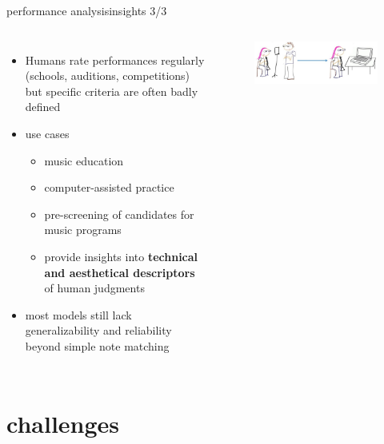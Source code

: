         \begin{frame}{performance analysis}{insights 3/3}
            \vspace{-5mm}
            \begin{columns}
            \begin{itemize}
                \item Humans rate performances regularly (schools, auditions, competitions) but specific criteria are often badly defined
                \item use cases
                    \begin{itemize}
                        \item	music education
                        \item computer-assisted practice
                        \item pre-screening of candidates for music programs
                        \item provide insights into \textbf{technical and aesthetical descriptors} of human judgments
                    \end{itemize}
                \item   most models still lack generalizability and reliability beyond simple note matching

            \end{itemize}
            
                \begin{figure}
                   \includegraphics[width=\columnwidth]{graph/performance_assessment}
                \end{figure}
            \end{columns}
       \end{frame}
        
    \section{challenges}
  

